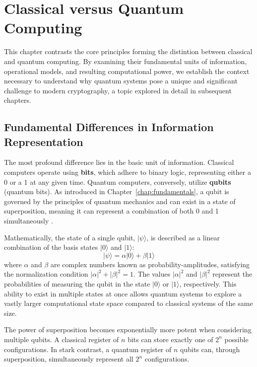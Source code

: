 \chapter{Classical versus Quantum Computing}\label{chap:classical_vs_quantum_rev}

This chapter contrasts the core principles forming the distintion between classical and quantum computing. By examining their fundamental units of information, operational models, and resulting computational power, we establish the context necessary to understand why quantum systems pose a unique and significant challenge to modern cryptography, a topic explored in detail in subsequent chapters.

\section{Fundamental Differences in Information Representation}\label{sec:differences_rev}

The most profound difference lies in the basic unit of information. Classical computers operate using \textbf{\glspl{bit}}, which adhere to binary logic, representing either a 0 or a 1 at any given time. Quantum computers, conversely, utilize \textbf{\glspl{qubit}} (quantum bits). As introduced in Chapter~\ref{chap:fundamentals}, a \gls{qubit} is governed by the principles of quantum mechanics and can exist in a state of \gls{superposition}, meaning it can represent a combination of both 0 and 1 simultaneously \parencite{nielsen_chuang_book}.

Mathematically, the state of a single \gls{qubit}, $|\psi\rangle$, is described as a linear combination of the basis states $|0\rangle$ and $|1\rangle$:
\begin{equation}\label{eq:qubit_state_ch4_rev}
    |\psi\rangle = \alpha|0\rangle + \beta|1\rangle
\end{equation}
where $\alpha$ and $\beta$ are complex numbers known as \glspl{probability-amplitude}, satisfying the normalization condition $|\alpha|^2 + |\beta|^2 = 1$. The values $|\alpha|^2$ and $|\beta|^2$ represent the probabilities of measuring the \gls{qubit} in the state $|0\rangle$ or $|1\rangle$, respectively. This ability to exist in multiple states at once allows quantum systems to explore a vastly larger computational state space compared to classical systems of the same size.

The power of \gls{superposition} becomes exponentially more potent when considering multiple \glspl{qubit}. A classical register of $n$ \glspl{bit} can store exactly one of $2^n$ possible configurations. In stark contrast, a quantum register of $n$ \glspl{qubit} can, through \gls{superposition}, simultaneously represent all $2^n$ configurations.

